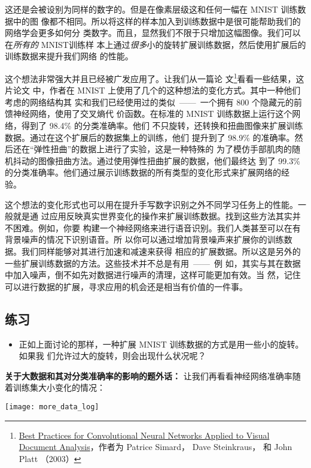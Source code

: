 这还是会被设别为同样的数字的。但是在像素层级这和任何一幅在 MNIST 训练数据中的图
像都不相同。所以将这样的样本加入到训练数据中是很可能帮助我们的网络学会更多如何分
类数字。而且，显然我们不限于只增加这幅图像。我们可以在\emph{所有的} MNIST训练样
本上通过\emph{很多}小的旋转扩展训练数据，然后使用扩展后的训练数据来提升我们网络
的性能。

这个想法非常强大并且已经被广发应用了。让我们从一篇论
文\footnote{\href{http://dx.doi.org/10.1109/ICDAR.2003.1227801}{Best Practices
    for Convolutional Neural Networks Applied to Visual Document Analysis}，作者为
  Patrice Simard， Dave Steinkraus， 和 John Platt （2003）}看看一些结果，这片论文
中，作者在 MNIST 上使用了几个的这种想法的变化方式。其中一种他们考虑的网络结构其
实和我们已经使用过的类似~——~一个拥有 800 个隐藏元的前馈神经网络，使用了交叉熵代
价函数。在标准的 MNIST 训练数据上运行这个网络，得到了 98.4\% 的分类准确率。他们
不只旋转，还转换和扭曲图像来扩展训练数据。通过在这个扩展后的数据集上的训练，他们
提升到了 98.9\% 的准确率。然后还在“弹性扭曲”的数据上进行了实验，这是一种特殊的
为了模仿手部肌肉的随机抖动的图像扭曲方法。通过使用弹性扭曲扩展的数据，他们最终达
到了 99.3\% 的分类准确率。他们通过展示训练数据的所有类型的变化形式来扩展网络的经
验。

这个想法的变化形式也可以用在提升手写数字识别之外不同学习任务上的性能。一般就是通
过应用反映真实世界变化的操作来扩展训练数据。找到这些方法其实并不困难。例如，你要
构建一个神经网络来进行语音识别。我们人类甚至可以在有背景噪声的情况下识别语音。所
以你可以通过增加背景噪声来扩展你的训练数据。我们同样能够对其进行加速和减速来获得
相应的扩展数据。所以这是另外的一些扩展训练数据的方法。这些技术并不总是有用~——~例
如，其实与其在数据中加入噪声，倒不如先对数据进行噪声的清理，这样可能更加有效。当
然，记住可以进行数据的扩展，寻求应用的机会还是相当有价值的一件事。

\subsection*{练习}

\begin{itemize}
\item 正如上面讨论的那样，一种扩展 MNIST 训练数据的方式是用一些小的旋转。如果我
  们允许过大的旋转，则会出现什么状况呢？
\end{itemize}

\textbf{关于大数据和其对分类准确率的影响的题外话：} 让我们再看看神经网络准确率随
着训练集大小变化的情况：
\begin{center}
\texttt{[image: more\_data\_log]}
\end{center}

